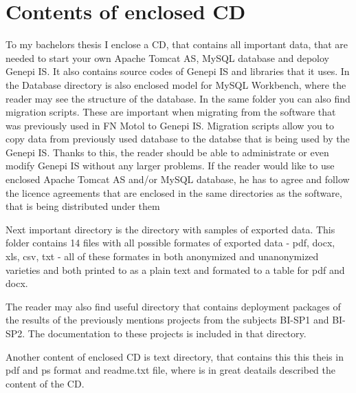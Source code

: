 \documentclass[thesis=B,english]{FITthesis}[2012/10/20]
\begin{document}



\chapter{Contents of enclosed CD}
To my bachelors thesis I enclose a CD, that contains all important data, that are needed to start your own Apache Tomcat AS, MySQL database and depoloy Genepi IS. It also contains source codes of Genepi IS and libraries that it uses. In the Database directory is also enclosed model for MySQL Workbench, where the reader may see the structure of the database. In the same folder you can also find migration scripts. These are important when migrating from the software that was previously used in FN Motol to Genepi IS. Migration scripts allow you to copy data from previously used database to the databse that is being used by the Genepi IS.
Thanks to this, the reader should be able to administrate or even modify Genepi IS without any larger problems. If the reader would like to use enclosed Apache Tomcat AS and/or MySQL database, he has to agree and follow the licence agreements that are enclosed in the same directories as the software, that is being distributed under them

Next important directory is the directory with samples of exported data. This folder contains 14 files with all possible formates of exported data - pdf, docx, xls, csv, txt - all of these formates in both anonymized and unanonymized varieties and both printed to as a plain text and formated to a table for pdf and docx.

The reader may also find useful directory that contains deployment packages of the results of the previously mentions projects from the subjects BI-SP1 and BI-SP2. The documentation to these projects is included in that directory.

Another content of enclosed CD is text directory, that contains this this theis in pdf and ps format and readme.txt file, where is in great deatails described the content of the CD.
\end{document}
